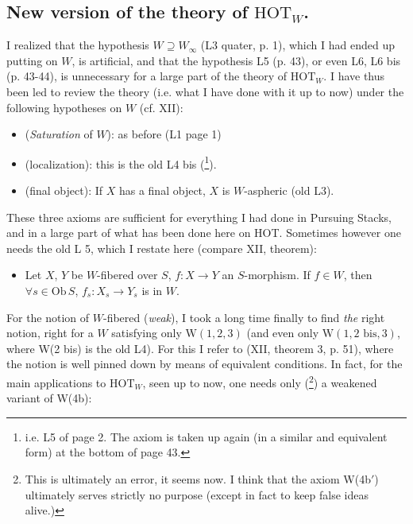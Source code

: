 \setcounter{footnote}{81}



\subsection*{New version of the theory of $\mathrm{HOT}_W$.}

I realized that the hypothesis $W \supseteq W_\infty$ (L3 quater, p. 1), which I had ended up putting on $W$, is artificial, and that the hypothesis L5 (p. 43), or even L6, L6 bis (p. 43-44), is unnecessary for a large part of the theory of $\mathrm{HOT}_W$. I have thus been led to review the theory (i.e. what I have done with it up to now) under the following hypotheses on $W$ (cf. XII):

\begin{itemize}[leftmargin=4em]
\item[W(1)] (\textit{Saturation} of $W$): as before (L1 page 1)
\item[W(2)] (localization): this is the old L4 bis (\footnote{i.e. L5 of page 2. The axiom is taken up again (in a similar and equivalent form) at the bottom of page 43.}).
\item[W(3)] (final object): If $X$ has a final object, $X$ is $W$-aspheric (old L3).
\end{itemize}

These three axioms are sufficient for everything I had done in Pursuing Stacks, and in a large part of what has been done here on HOT. Sometimes however one needs the old L 5, which I restate here (compare XII, theorem): %

\begin{itemize}[leftmargin=4em]
\item[W(4b)] Let $X$, $Y$ be $W$-fibered over $S$, $f : X \longrightarrow Y$ an $S$-morphism. If $f \in W$, then $\forall s \in \mathrm{Ob}\, S$, $f_s : X_s \longrightarrow Y_s$ is in $W$.
\end{itemize}

For the notion of $W$-fibered (\textit{weak}), I took a long time finally to find \textit{the} right notion, right for a $W$ satisfying only $\mathrm{W}(1,2,3)$ (and even only $\mathrm{W}(1, 2 \text{ bis}, 3)$, where W(2 bis) is the old L4). For this I refer to (XII, theorem 3, p. 51), where the notion is well pinned down by means of equivalent conditions. In fact, for the main applications to $\mathrm{HOT}_W$, seen up to now, one needs only (\footnote{This is ultimately an error, it seems now. I think that the axiom W(4b$'$) ultimately serves strictly no purpose (except in fact to keep false ideas alive.)}) a weakened variant of W(4b):

